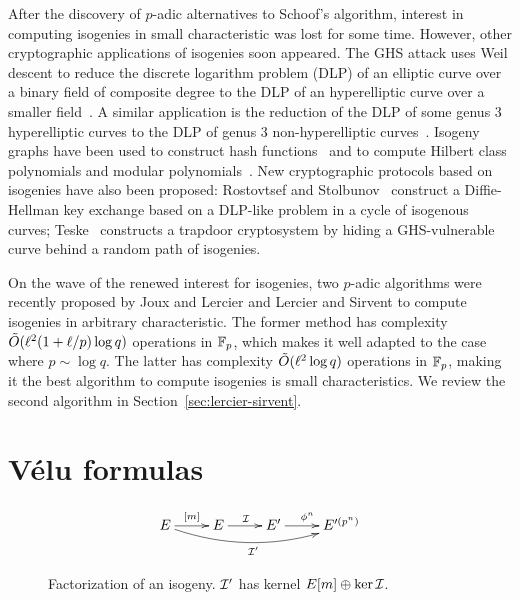 After the discovery of $p$-adic alternatives to Schoof's
algorithm\cite{satoh00,fouquet+gaudry+harley00}, interest in computing
isogenies in small characteristic was lost for some time. However,
other cryptographic applications of isogenies soon appeared.  The
GHS attack uses Weil descent to reduce the
discrete logarithm problem
(DLP) of an elliptic curve
over a binary field of composite degree to the DLP of an hyperelliptic
curve over a smaller field~\cite{gaudry+hess+smart02,GHS,hess03}. A
similar application is the reduction of the DLP of some genus $3$
hyperelliptic curves to the DLP of genus $3$ non-hyperelliptic
curves~\cite{smith09}. Isogeny graphs have been used to construct hash
functions~\cite{charles+lauter+goren09} and to compute Hilbert class
polynomials and modular
polynomials~\cite{sutherland10:hilbert,sutherland10:modpol}. New
cryptographic protocols based on isogenies have also been proposed:
Rostovtsef and Stolbunov~\cite{rostovtsev+stolbunov06} construct a
Diffie-Hellman key exchange based on a DLP-like problem in a cycle of
isogenous curves; Teske~\cite{mauer+menezes+teske01,teske06}
constructs a trapdoor cryptosystem by hiding a GHS-vulnerable curve
behind a random path of isogenies.

On the wave of the renewed interest for isogenies, two $p$-adic
algorithms were recently proposed by Joux and Lercier
\cite{joux+lercier06} and Lercier and Sirvent \cite{lercier+sirvent08}
to compute isogenies in arbitrary characteristic. The former method
has complexity $\tilde{O}(\ell^2(1 + \ell/p)\log q)$ operations in
$\mathbb{F}_p$, which makes it well adapted to the case where $p\sim\log q$.
The latter has complexity $\tilde{O}(\ell^2\log q)$ operations in $\mathbb{F}_p$,
making it the best algorithm to compute isogenies is small
characteristics. We review the second algorithm in
Section~\ref{sec:lercier-sirvent}.


\section{Vélu formulas}
\label{sec:velu-formulas}


\begin{figure}
  \centering
  \[\xymatrix{
    E \ar[r]^{[m]}\ar@/_1pc/[rrr]_{\I'} & E \ar[r]^\I & E' \ar[r]^{\frobisog^n} & E'^{(p^n)}\\
  }\]
  \label{fig:fact}
  \caption{Factorization of an isogeny. $\mathcal{I}'$ has kernel $E[m]\oplus\ker\mathcal{I}$.}
\end{figure}

